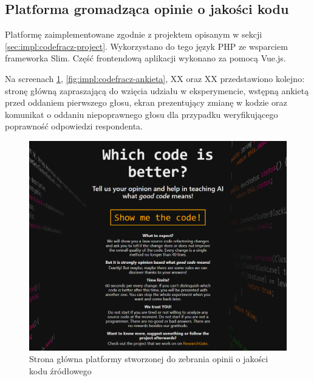 \documentclass[12pt]{report}
\begin{document}
\subsection{Platforma gromadząca opinie o jakości kodu}

Platformę zaimplementowane zgodnie z projektem opisanym w sekcji \ref{sec:impl:codefracz-project}. Wykorzystano do tego język PHP ze wsparciem frameworka Slim. Część frontendową aplikacji wykonano za pomocą Vue.js.

Na screenach \ref{fig:impl:codefracz-front}, \ref{fig:impl:codefracz-ankieta}, XX oraz XX przedstawiono kolejno: stronę główną zapraszającą do wzięcia udziału w eksperymencie, wstępną ankietą przed oddaniem pierwszego głosu, ekran prezentujący zmianę w kodzie oraz komunikat o oddaniu niepoprawnego głosu dla przypadku weryfikującego poprawność odpowiedzi respondenta.

\begin{figure}
\centering
\includegraphics[width=\textwidth]{impl/codefracz-front.png}
\caption{Strona główna platformy stworzonej do zebrania opinii o jakości kodu źródłowego}
\label{fig:impl:codefracz-front}
\end{figure}
\end{document}
